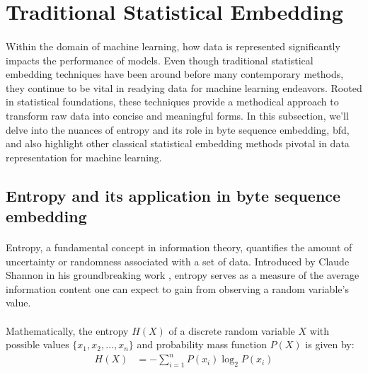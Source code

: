 \section{Traditional Statistical Embedding}\label{seq:background:traditional_statistical_embedding}

    \paragraph{}Within the domain of machine learning, how data is represented significantly impacts the performance of models. Even though traditional statistical embedding techniques have been around before many contemporary methods, they continue to be vital in readying data for machine learning endeavors. Rooted in statistical foundations, these techniques provide a methodical approach to transform raw data into concise and meaningful forms. In this subsection, we'll delve into the nuances of entropy and its role in byte sequence embedding, \acrfull{bfd}, and also highlight other classical statistical embedding methods pivotal in data representation for machine learning.
        
    \subsection{Entropy and its application in byte sequence embedding}
        \paragraph{}Entropy, a fundamental concept in information theory, quantifies the amount of uncertainty or randomness associated with a set of data. Introduced by Claude Shannon in his groundbreaking work \cite{shannon_mathematical_1948}, entropy serves as a measure of the average information content one can expect to gain from observing a random variable's value.

        \paragraph{}Mathematically, the entropy \(H(X)\) of a discrete random variable \(X\) with possible values \newline \(\{x_1, x_2, \ldots, x_n\}\) and probability mass function \(P(X)\) is given by:
        \begin{align}
            H(X) &= -\sum_{i=1}^{n} P(x_i) \log_2 P(x_i)
            \label{eq:shannon_entropy}
        \end{align}

